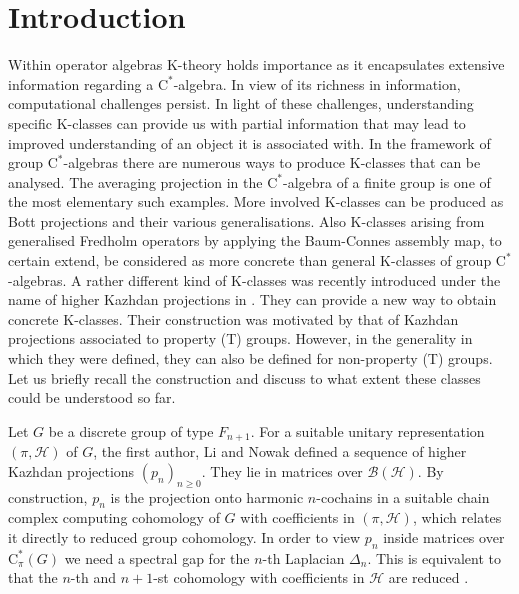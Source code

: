 \documentclass[a4paper,leqno,12pt]{article}
\numberwithin{equation}{section}
\theoremstyle{plain}
\theoremstyle{definition}
\theoremstyle{remark}
\newcommand{\Cs}{\mathrm{C}^*}
\begin{document}
	\section{Introduction}
	\label{sec:introduction}
	Within operator algebras K-theory holds importance as it encapsulates extensive information regarding a $\Cs$-algebra. In view of its richness in information, computational challenges persist.
	In light of these challenges, understanding specific K-classes can provide us with partial information that may lead to improved understanding of an object it is associated with. 
	In the framework of group $\Cs$-algebras there are numerous ways to produce K-classes that can be analysed. 
	The averaging projection in the $\Cs$-algebra of a finite group is one of the most elementary such examples. More involved K-classes can be produced 
	as Bott projections and their various generalisations. Also K-classes arising from generalised Fredholm operators by applying the Baum-Connes assembly map, to certain extend, be considered as more concrete than general K-classes of group $\Cs$-algebras.
	A rather different kind of K-classes was recently introduced under the name of higher Kazhdan projections in \cite{linowakpooya2020}. They can provide a new way to obtain concrete K-classes. 
	Their construction was motivated by that of Kazhdan projections associated to property (T) groups. However, in the generality in which they were defined, they can also be defined for non-property (T) groups.	
	Let us briefly recall the construction and discuss to what extent these classes could be understood so far.
		
	Let $G$ be a discrete group of type $F_{n+1}$. For a suitable unitary representation $(\pi, \mathcal H)$ of $G$, the first author, Li and Nowak defined a sequence of higher Kazhdan projections $(p_n)_{n\ge 0}$. They lie in matrices over $\mathcal B(\mathcal H)$. 
	By construction, $p_n$ is the projection onto harmonic $n$-cochains in a suitable chain complex computing cohomology of $G$ with coefficients in $(\pi, \mathcal H)$, which relates it directly to reduced group cohomology. 
	In order to view $p_n$ inside matrices over $\Cs_{\pi}(G)$ we need a spectral gap for the $n$-th Laplacian $\Delta_n$. This is equivalent to that the $n$-th and $n+1$-st cohomology with coefficients in $\mathcal H$ are reduced  \cite{badernowak2015}. 	
	
\end{document}
